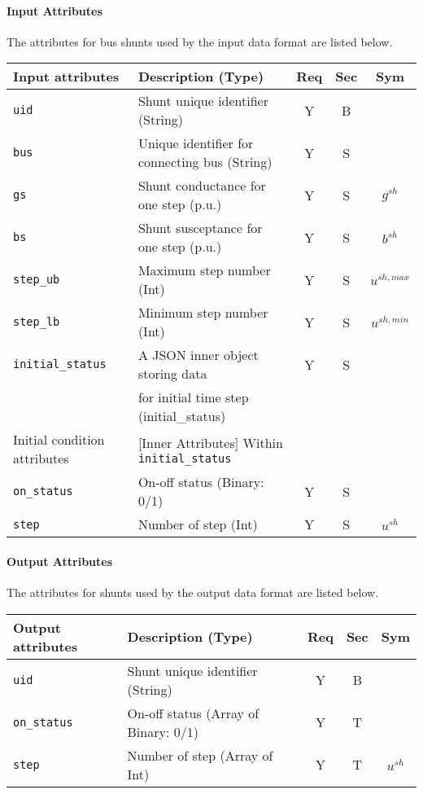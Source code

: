 \documentclass{article}
\begin{document}
\paragraph{Input Attributes} The attributes for bus shunts used by the input data format are listed below.
\begin{center}
\small

\begin{tabular}{ l | l | c | c | c | }
Input attributes & Description (Type) & Req & Sec & Sym\\
\hline
  {\tt uid} & Shunt unique identifier (String) & Y & B &  \\
  {\tt bus} & Unique identifier for connecting bus (String)& Y & S &  \\
  {\tt gs}  & Shunt conductance for one step (p.u.) & Y & S & $g^{sh}$ \\
  {\tt bs}  & Shunt susceptance for one step (p.u.) & Y & S & $b^{sh}$ \\
  {\tt step\_ub}      & Maximum step number (Int)  & Y & S & $u^{sh,max}$\\
  {\tt step\_lb}      & Minimum step number (Int)  & Y & S & $u^{sh,min}$\\
  {\tt initial\_status} & A JSON inner object storing data  & Y & S &  \\
       & for initial time step (initial\_status) &  &  &  \\
  \hline
  Initial condition attributes & [Inner Attributes] Within {\tt initial\_status} & & & \\
  \hline
  {\tt on\_status} & On-off status (Binary: 0/1) & Y & S & \\
  {\tt step}       & Number of step (Int)  & Y  & S &$u^{sh}$\\  
\hline
\end{tabular}
\end{center}

\paragraph{Output Attributes} The attributes for shunts used by the output data format are listed below.

\begin{center}
\small
\begin{tabular}{ l | l | c | c | c |}
Output attributes & Description (Type) & Req & Sec & Sym\\
\hline
  {\tt uid} & Shunt unique identifier (String) & Y & B & \\
  {\tt on\_status} & On-off status (Array of Binary: 0/1) & Y & T & \\
  {\tt step}      & Number of step (Array of Int)  & Y  & T &$u^{sh}$\\
\hline
\end{tabular}
\end{center}
\end{document}
